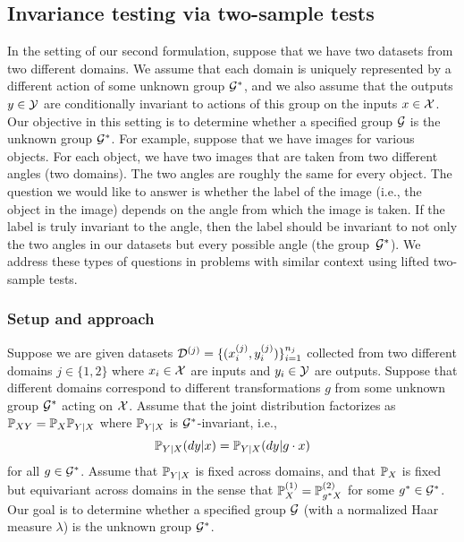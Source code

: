 \subsection{Invariance testing via two-sample tests} \label{sec:twosample}

In the setting of our second formulation, suppose that we have two datasets from two different domains. We assume that each domain is uniquely represented by a different action of some unknown group $\calG^*$, and we also assume that the outputs $y\in\calY$ are conditionally invariant to actions of this group on the inputs $x\in\calX$. Our objective in this setting is to determine whether a specified group $\calG$ is the unknown group $\calG^*$. For example, suppose that we have images for various objects. For each object, we have two images that are taken from two different angles (two domains). The two angles are roughly the same for every object. The question we would like to answer is whether the label of the image (i.e., the object in the image) depends on the angle from which the image is taken. If the label is truly invariant to the angle, then the label should be invariant to not only the two angles in our datasets but every possible angle (the group~$\calG^*$). We address these types of questions in problems with similar context using lifted two-sample tests.

\subsubsection{Setup and approach}

Suppose we are given datasets $\calD^{(j)}=\{(x_i^{(j)},y_i^{(j)})\}_{i=1}^{n_j}$ collected from two different domains $j\in\{1,2\}$ where $x_i\in\calX$ are inputs and $y_i\in\calY$ are outputs. Suppose that different domains correspond to different transformations $g$ from some unknown group $\calG^*$ acting on $\calX$. Assume that the joint distribution factorizes as $\P_{XY}=\P_X\P_{Y|X}$ where $\P_{Y|X}$ is $\calG^*$-invariant, i.e.,
\[
\bbP_{Y|X}(dy|x) = \bbP_{Y|X}(dy|g\cdot x)
\]
for all $g\in\calG^*$. Assume that $\P_{Y|X}$ is fixed across domains, and that $\P_X$ is fixed but equivariant across domains in the sense that $\P_X^{(1)}=\P_{g^*X}^{(2)}$ for some $g^*\in\calG^*$. Our goal is to determine whether a specified group $\calG$ (with a normalized Haar measure $\lambda$) is the unknown group $\calG^*$.
\\

